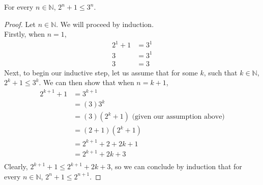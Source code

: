 \documentclass[12pt]{article}
\newenvironment{theorem}[2][Theorem]{\begin{trivlist}
\item[\hskip \labelsep {\bfseries #1}\hskip \labelsep {\bfseries #2.}]}{\end{trivlist}}
\begin{document}
\begin{theorem}{WA 6.2}
	For every $n \in \mathbb{N}$, $2^n+1 \le 3^{n}$.\\
\end{theorem}
\begin{proof}
	Let $n \in \mathbb{N}$. We will proceed by induction.\\
	Firstly, when $n=1$,
	\begin{align*}
		2^1+1 &= 3^1\\
		    3 &= 3^1\\
		    3 &= 3 
\end{align*}
Next, to begin our inductive step, let us assume that for some $k$, such that $k \in \mathbb{N}$, $2^k+1 \le 3^k$. We can then
show that when $n=k+1$,
\begin{align*}
	2^{k+1}+1 &= 3^{k+1}\\
		  &= (3)3^k\\
		  &= (3)(2^k+1) \text{ (given our assumption above)}\\
		  &= (2+1)(2^k+1)\\
		  &= 2^{k+1}+2+2k+1\\
		  &= 2^{k+1}+2k+3\\
\end{align*}
Clearly, $2^{k+1}+1 \le 2^{k+1}+2k+3$, so we can conclude by induction that for every $n \in \mathbb{N}$, $2^n+1 \le 2^{n+1}$.


\end{proof}
 

    



 
 
\end{document}
